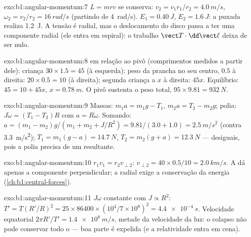 \begin{solution}{exo:b1:angular-momentum:7}
$L = mrv$ se conserva: $v_2 = v_1r_1/r_2 = \qty{4.0}{m/s}$, $\omega_2 = v_2/r_2
= \qty{16}{rad/s}$ (partindo de \qty{4}{rad/s}). $E_1 = \qty{0.40}{J}$, $E_2 =
\qty{1.6}{J}$: a puxada realiza \qty{1.2}{J}. A tensão é radial, mas o
deslocamento do disco passa a ter uma componente radial (ele entra em espiral): o trabalho
$\vect T\cdot\dd\vect\ell$ deixa de ser nulo.
\end{solution}

\begin{solution}{exo:b1:angular-momentum:8}
 em relação ao pivô (comprimentos medidos a partir dele): criança $30 \times 1.5 =
45$ (à esquerda); peso da prancha no seu centro, $0.5$ à direita: $20 \times
0.5 = 10$ (à direita); segunda criança a $x$ à direita: $45x$. Equilíbrio:
$45 = 10 + 45x$, $x = \qty{0.78}{m}$. O pivô sustenta o peso total,
$95 \times 9.81 = \qty{932}{N}$.
\end{solution}

\begin{solution}{exo:b1:angular-momentum:9}
Massas: $m_1a = m_1g - T_1$, $m_2a = T_2 - m_2g$; polia: $J\dot\omega =
(T_1 - T_2)R$ com $a = R\dot\omega$. Somando: $a = (m_1 - m_2)g/(m_1 + m_2 +
J/R^2) = 9.81/(3.0 + 1.0) = \qty{2.5}{m/s^2}$ (contra \qty{3.3}{m/s^2});
$T_1 = m_1(g - a) = \qty{14.7}{N}$, $T_2 = m_2(g + a) = \qty{12.3}{N}$ ---
desiguais, pois a polia precisa de um  resultante.
\end{solution}

\begin{solution}{exo:b1:angular-momentum:10}
$r_1v_1 = r_2v_{\perp 2}$: $v_{\perp 2} = 40 \times 0.5/10 = \qty{2.0}{km/s}$.
A  dá apenas a componente perpendicular; a radial
exige a conservação da energia (\cref{ch:b1:central-forces}).
\end{solution}

\begin{solution}{exo:b1:angular-momentum:11}
$J\omega$ constante com $J \propto R^2$: $T' = T(R'/R)^2 = 25 \times 86400
\times (10^4/7\times10^8)^2 = \qty{4.4e-4}{s}$. Velocidade equatorial $2\pi R'/T'
= \qty{1.4e8}{m/s}$, metade da velocidade da luz: o colapso não pode conservar
todo o  --- boa parte é expelida (e a relatividade entra em cena).
\end{solution}

